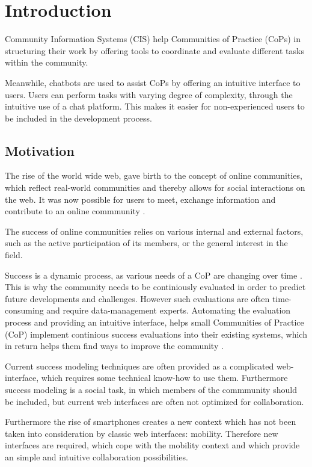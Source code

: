 \chapter{Introduction}
Community Information Systems (CIS) help Communities of Practice (CoPs) in structuring their work by offering tools to coordinate and evaluate different tasks within the community.

Meanwhile, chatbots are used to assist CoPs by offering an intuitive interface to users. Users can perform tasks with varying degree of complexity, through the intuitive use of a chat platform. This makes it easier for non-experienced users to be included in the development process.

\section{Motivation}
The rise of the world wide web, gave birth to the concept of online communities, which reflect real-world communities and thereby allows for social interactions on the web. It was now possible for users to meet, exchange information and contribute to an online commmunity \cite{Renz08}.

The success of online communities relies on various internal and external factors, such as the active participation of its members, or the general interest in the field.

Success is a dynamic process, as various needs of a CoP are changing over time \cite{Renz08,GKJa08}. This is why the community needs to be continiously evaluated in order to predict future developments and challenges. However such evaluations are often time-consuming and require data-management experts. Automating the evaluation process and providing an intuitive interface, helps small Communities of Practice (CoP) implement continious success evaluations into their existing systems, which in return helps them find ways to improve the community \cite{Renz08}.

Current success modeling techniques are often provided as a complicated web-interface, which requires some technical know-how to use them. Furthermore success modeling is a social task, in which members of the commmunity should be included, but current web interfaces are often not optimized for collaboration.

Furthermore the rise of smartphones creates a new context which has not been taken into consideration by classic web interfaces: mobility.
Therefore new interfaces are required, which cope with the mobility context and which provide an simple and intuitive collaboration possibilities.


